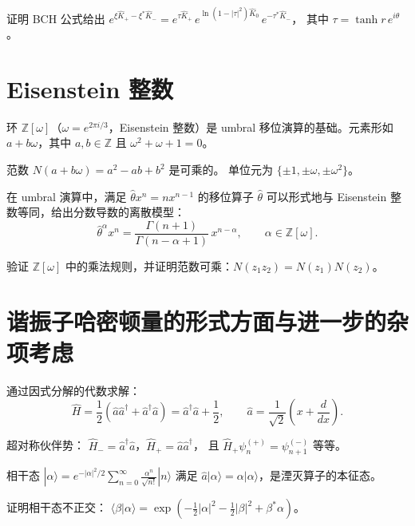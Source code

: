 \begin{exercise}
证明 BCH 公式给出
$e^{\xi\hat K_+-\xi^*\hat K_-}=e^{\tau\hat K_+}\,e^{\ln(1-|\tau|^2)\hat K_0}\,e^{-\tau^*\hat K_-}$，
其中 $\tau = \tanh r\,e^{i\theta}$。
\end{exercise}

\section{Eisenstein 整数}

环 $\mathbb Z[\omega]$（$\omega=e^{2\pi i/3}$，Eisenstein 整数）是 umbral 移位演算的基础。元素形如 $a+b\omega$，其中
$a,b\in\mathbb Z$ 且 $\omega^2+\omega+1=0$。

范数 $N(a+b\omega)=a^2-ab+b^2$ 是可乘的。
单位元为 $\{\pm1,\pm\omega,\pm\omega^2\}$。

在 umbral 演算中，满足 $\hat\theta x^n = n x^{n-1}$ 的移位算子 $\hat\theta$ 可以形式地与 Eisenstein 整数等同，给出分数导数的离散模型：
\begin{equation}
\hat\theta^\alpha x^n = \frac{\Gamma(n+1)}{\Gamma(n-\alpha+1)}\,x^{n-\alpha},
\qquad \alpha\in\mathbb Z[\omega].
\label{eq:7.5.1}
\end{equation}

\begin{exercise}
验证 $\mathbb Z[\omega]$ 中的乘法规则，并证明范数可乘：$N(z_1z_2)=N(z_1)N(z_2)$。
\end{exercise}

\section{谐振子哈密顿量的形式方面与进一步的杂项考虑}

通过因式分解的代数求解：
\begin{equation}
\hat H = \frac12(\hat a\hat a^\dagger + \hat a^\dagger\hat a)
= \hat a^\dagger\hat a + \frac12,
\qquad \hat a = \frac{1}{\sqrt{2}}\!\left(x+\frac{d}{dx}\right).
\label{eq:7.6.1}
\end{equation}

超对称伙伴势：
$\hat H_-=\hat a^\dagger\hat a$，$\hat H_+=\hat a\hat a^\dagger$，
且 $\hat H_+\psi_n^{(+)}=\psi_{n+1}^{(-)}$ 等等。

相干态 $|\alpha\rangle=e^{-|\alpha|^2/2}\sum_{n=0}^\infty\frac{\alpha^n}{\sqrt{n!}}|n\rangle$
满足 $\hat a|\alpha\rangle=\alpha|\alpha\rangle$，是湮灭算子的本征态。

\begin{exercise}
证明相干态不正交：
$\langle\beta|\alpha\rangle = \exp(-\tfrac12|\alpha|^2-\tfrac12|\beta|^2+\beta^*\alpha)$。
\end{exercise}

